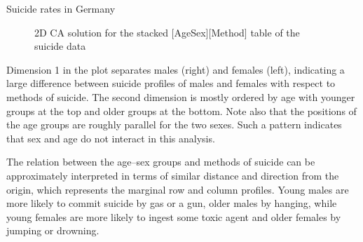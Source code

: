 \documentclass[11pt]{book}\usepackage[]{graphicx}\usepackage[]{color}
\newenvironment{knitrout}{}{} %
\renewenvironment{knitrout}{\small\renewcommand{\baselinestretch}{.85}}{} %
\begin{document}
\begin{Example}[suicide1]{Suicide rates in Germany}
\begin{knitrout}
\begin{figure}[htbp]
\caption[2D CA solution for the stacked AgeSex, Method table of the suicide data]{2D CA solution for the stacked [AgeSex][Method] table of the suicide data\label{fig:ca-suicide-plot}}
\end{figure}


\end{knitrout}


Dimension 1 in the plot separates males (right) and females (left),
indicating a large difference between suicide profiles of males and
females with respect to methods of suicide.  
The second dimension is mostly ordered by age with younger
groups at the top and older groups at the bottom.  Note also that the
positions of the age groups are roughly parallel for the two
sexes.  
Such a pattern indicates that sex and age do not interact in this analysis.

The relation between the age--sex groups and methods
of suicide can be approximately interpreted in terms of similar distance and
direction from the origin, which represents the marginal row and
column profiles.  Young males are more likely to commit suicide by
gas or a gun, older males by hanging, while young females are more
likely to ingest some toxic agent and older females by jumping or
drowning.
\end{Example}
\end{document}
